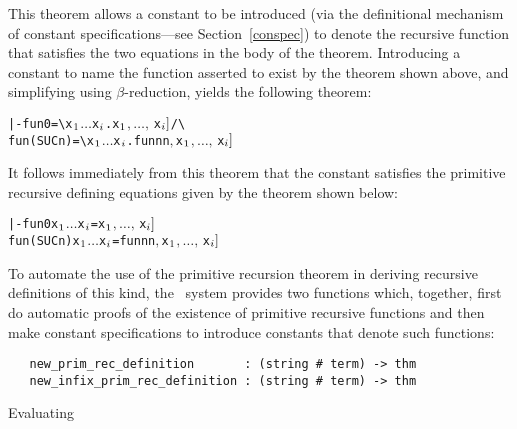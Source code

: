 \noindent This theorem allows a constant  to be introduced (via the
definitional mechanism of constant specifications---see Section~\ref{conspec})
to denote the recursive function that satisfies the two equations in the body
of the theorem. Introducing a constant  to name the function asserted
to exist by the theorem shown above, and simplifying using $\beta$-reduction,
yields the following theorem:

\begin{hol}\begin{alltt}
   |- fun 0       = \verb!\!x\(\sb{1}\) \(\dots\) x\(\sb{i}\).\m{f\sb{1}[}x\(\sb{1}\)\(,\ldots,\,\)x\(\sb{i}]\) /\verb!\!
      fun (SUC n) = \verb!\!x\(\sb{1}\) \(\dots\) x\(\sb{i}\).\m{f\sb{2}[}fun n  n\(,\) x\(\sb{1}\)\(,\ldots,\,\)x\(\sb{i}]\)
\end{alltt}\end{hol}

\noindent It follows immediately from this theorem that the constant 
satisfies the primitive recursive defining equations given by the theorem shown
below:

\begin{hol}\begin{alltt}
   |- fun 0 x\(\sb{1}\) \(\dots\) x\(\sb{i}\) = \m{f\sb{1}[}x\(\sb{1}\)\(,\ldots,\,\)x\(\sb{i}]\)
      fun (SUC n) x\(\sb{1}\) \(\dots\) x\(\sb{i}\) = \m{f\sb{2}[}fun n  n\(,\) x\(\sb{1}\)\(,\ldots,\,\)x\(\sb{i}]\)
\end{alltt}\end{hol}

To automate the use of the primitive recursion theorem in deriving recursive
definitions of this kind, the \HOL\ system provides two functions which,
together, first do automatic proofs of the existence of primitive recursive
functions and then make constant specifications to introduce constants that
denote such functions:

\begin{boxed}
\begin{verbatim}
   new_prim_rec_definition       : (string # term) -> thm
   new_infix_prim_rec_definition : (string # term) -> thm
\end{verbatim}\end{boxed}

\noindent Evaluating


